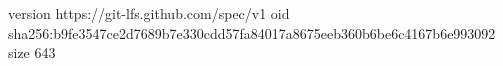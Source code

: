 version https://git-lfs.github.com/spec/v1
oid sha256:b9fe3547ce2d7689b7e330cdd57fa84017a8675eeb360b6be6c4167b6e993092
size 643
